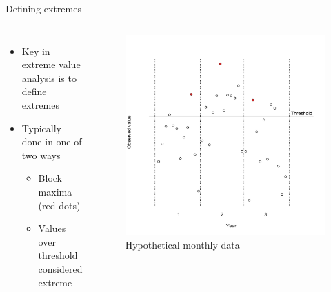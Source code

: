 \documentclass{beamer}
\begin{document}
 \begin{frame}{Defining extremes}
 \begin{columns}[c]
   \begin{itemize} \setlength{\itemsep}{1em}
     \item Key in extreme value analysis is to define extremes
     \item Typically done in one of two ways
     \begin{itemize}
       \item Block maxima (red dots)
       \item Values over threshold considered extreme
     \end{itemize}
   \end{itemize}

   \begin{figure}
     \includegraphics[width=1\linewidth, trim=0 0.5in 0 1in]{./plots/define_extreme.pdf}
     \caption{Hypothetical monthly data}
     \end{figure}
 \end{columns}
 \end{frame}
\end{document}
